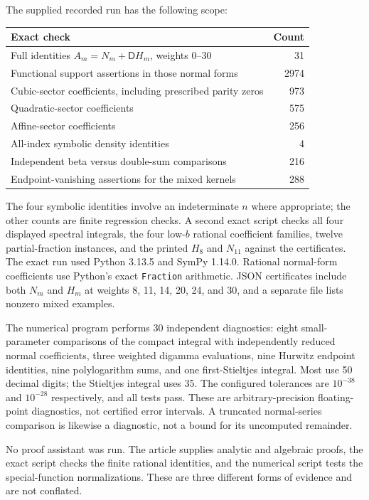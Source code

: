 \documentclass[11pt]{article}
\numberwithin{equation}{section}
\theoremstyle{definition}\newtheorem{definition}[theorem]{Definition}
\theoremstyle{remark}\newtheorem{remark}[theorem]{Remark}
\newcommand{\D}{\mathsf D}\newcommand{\Euler}{\mathscr E}
\begin{document}
The supplied recorded run has the following scope:
\begin{center}
\begin{tabular}{lr}
\toprule
Exact check & Count\\
\midrule
Full identities $A_m=N_m+\D H_m$, weights $0$--$30$ & 31\\
Functional support assertions in those normal forms & 2974\\
Cubic-sector coefficients, including prescribed parity zeros & 973\\
Quadratic-sector coefficients & 575\\
Affine-sector coefficients & 256\\
All-index symbolic density identities & 4\\
Independent beta versus double-sum comparisons & 216\\
Endpoint-vanishing assertions for the mixed kernels & 288\\
\bottomrule
\end{tabular}
\end{center}
The four symbolic identities involve an indeterminate $n$ where
appropriate; the other counts are finite regression checks.
A second exact script checks all four displayed spectral integrals, the four
low-$b$ rational coefficient families, twelve partial-fraction instances, and
the printed $H_8$ and $N_{11}$ against the certificates.
The exact run used Python 3.13.5 and SymPy 1.14.0. Rational normal-form
coefficients use Python's exact \texttt{Fraction} arithmetic. JSON
certificates include both $N_m$ and $H_m$ at weights 8, 11, 14, 20, 24,
and 30, and a separate file lists nonzero mixed examples.

The numerical program performs 30 independent diagnostics: eight
small-parameter comparisons of the compact integral with independently
reduced normal coefficients, three weighted digamma evaluations, nine
Hurwitz endpoint identities, nine polylogarithm sums, and one
first-Stieltjes integral. Most use 50 decimal digits; the Stieltjes
integral uses 35. The configured tolerances are $10^{-38}$ and
$10^{-28}$ respectively, and all tests pass. These are arbitrary-precision
floating-point diagnostics, not certified error intervals. A truncated
normal-series comparison is likewise a diagnostic, not a bound for its
uncomputed remainder.

No proof assistant was run. The article supplies analytic and algebraic
proofs, the exact script checks the finite rational identities, and the
numerical script tests the special-function normalizations. These are
three different forms of evidence and are not conflated.
\end{document}
